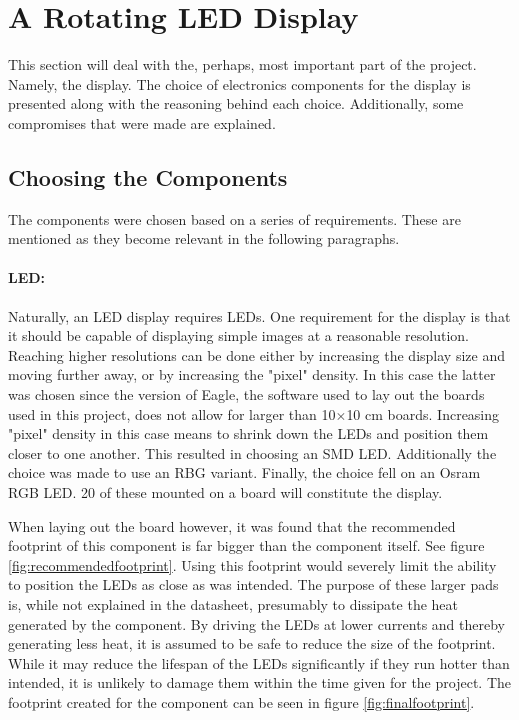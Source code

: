 \section{A Rotating LED Display}
This section will deal with the, perhaps, most important part of the project.
Namely, the display.
The choice of electronics components for the display is presented along with the reasoning behind each choice.
Additionally, some compromises that were made are explained.

\subsection{Choosing the Components}
The components were chosen based on a series of requirements.
These are mentioned as they become relevant in the following paragraphs.

\paragraph{LED:}
Naturally, an LED display requires LEDs.
One requirement for the display is that it should be capable of displaying simple images at a reasonable resolution.
Reaching higher resolutions can be done either by increasing the display size and moving further away, or by increasing the "pixel" density.
In this case the latter was chosen since the version of Eagle, the software used to lay out the boards used in this project, does not allow for larger than 10$\times$10 cm boards.
Increasing "pixel" density in this case means to shrink down the LEDs and position them closer to one another.
This resulted in choosing an SMD LED.
Additionally the choice was made to use an RBG variant.
Finally, the choice fell on an Osram RGB LED.
20 of these mounted on a board will constitute the display.

When laying out the board however, it was found that the recommended footprint of this component is far bigger than the component itself.
See figure \ref{fig:recommendedfootprint}.
Using this footprint would severely limit the ability to position the LEDs as close as was intended.
The purpose of these larger pads is, while not explained in the datasheet, presumably to dissipate the heat generated by the component.
By driving the LEDs at lower currents and thereby generating less heat, it is assumed to be safe to reduce the size of the footprint.
While it may reduce the lifespan of the LEDs significantly if they run hotter than intended, it is unlikely to damage them within the time given for the project.
The footprint created for the component can be seen in figure 
\ref{fig:finalfootprint}.


